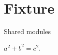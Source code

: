 \documentclass{beamer}
\begin{document}
\section{Fixture}
\begin{frame}{Shared modules}
  \begin{apotheorem}$a^2+b^2=c^2$.\end{apotheorem}
\end{frame}
\end{document}
